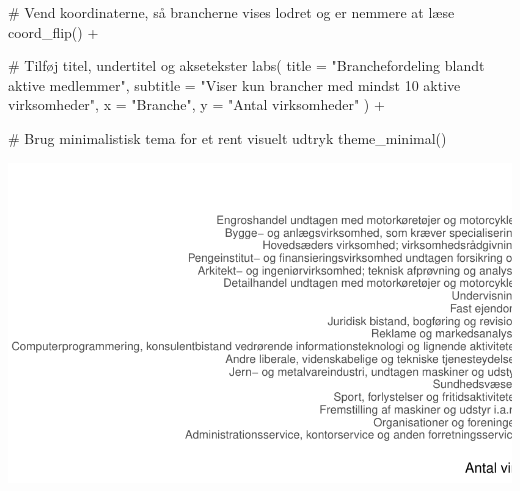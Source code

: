 \documentclass[
  11pt,
  letterpaper,
  DIV=11,
  numbers=noendperiod]{scrartcl}
\newenvironment{Shaded}{\begin{snugshade}}{\end{snugshade}}
\newcommand{\AttributeTok}[1]{\textcolor[rgb]{0.40,0.45,0.13}{#1}}
\newcommand{\CommentTok}[1]{\textcolor[rgb]{0.37,0.37,0.37}{#1}}
\newcommand{\FunctionTok}[1]{\textcolor[rgb]{0.28,0.35,0.67}{#1}}
\newcommand{\NormalTok}[1]{\textcolor[rgb]{0.00,0.23,0.31}{#1}}
\newcommand{\SpecialCharTok}[1]{\textcolor[rgb]{0.37,0.37,0.37}{#1}}
\newcommand{\StringTok}[1]{\textcolor[rgb]{0.13,0.47,0.30}{#1}}
\begin{document}
\begin{Shaded}
\begin{Highlighting}[]
  \CommentTok{\# Vend koordinaterne, så brancherne vises lodret og er nemmere at læse}
  \FunctionTok{coord\_flip}\NormalTok{() }\SpecialCharTok{+}

  \CommentTok{\# Tilføj titel, undertitel og aksetekster}
  \FunctionTok{labs}\NormalTok{(}
    \AttributeTok{title =} \StringTok{"Branchefordeling blandt aktive medlemmer"}\NormalTok{,}
    \AttributeTok{subtitle =} \StringTok{"Viser kun brancher med mindst 10 aktive virksomheder"}\NormalTok{,}
    \AttributeTok{x =} \StringTok{"Branche"}\NormalTok{,}
    \AttributeTok{y =} \StringTok{"Antal virksomheder"}
\NormalTok{  ) }\SpecialCharTok{+}

  \CommentTok{\# Brug minimalistisk tema for et rent visuelt udtryk}
  \FunctionTok{theme\_minimal}\NormalTok{()}
\end{Highlighting}
\end{Shaded}

\includegraphics{Quarto_files/figure-pdf/unnamed-chunk-6-4.pdf}
\end{document}
